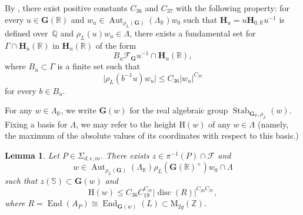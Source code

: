 \documentclass[11pt]{article}
\numberwithin{equation}{section}
\newcommand{\bQ}{\mathbb{Q}}
\newcommand{\bR}{\mathbb{R}}
\newcommand{\bZ}{\mathbb{Z}}
\newcommand{\cF}{\mathcal{F}}
\newcommand{\gG}{\mathbf{G}}
\newcommand{\gH}{\mathbf{H}}
\newcommand{\rH}{\mathrm{H}}
\newcommand{\rM}{\mathrm{M}}
\DeclareMathOperator{\Aut}{Aut}
\DeclareMathOperator{\disc}{disc}
\DeclareMathOperator{\End}{End}
\DeclareMathOperator{\Stab}{Stab}
\newcommand{\abs}[1]{\lvert #1 \rvert}
\newtheorem{lemma}{Lemma}[section]
\begin{document}
By \cite[Th.\,1.2]{QRTUI}, there exist positive constants $C_{36}$ and $C_{37}$ with the following property: for every $u\in\gG(\bR)$ and $w_u\in \Aut_{\rho_L(\gG)}(\Lambda_\bR) w_0$ such that $\gH_u = u \gH_{0,\bR} u^{-1}$ is defined over~$\bQ$ and $\rho_L(u) w_u \in \Lambda$, there exists a fundamental set for $\Gamma\cap\gH_u(\bR)$ in $\gH_u(\bR)$ of the form
\[
B_u\cF_\gG u^{-1}\cap\gH_u(\bR),\]
where $B_u\subset\Gamma$ is a finite set such that
\[\abs{\rho_L(b^{-1}u)w_u} \leq C_{36} \abs{w_u}^{C_{37}}\]
for every $b\in B_u$.

For any $w\in\Lambda_\bR$, we write $\gG(w)$ for the real algebraic group $\Stab_{\gG_\bR,\rho_L}(w)$. Fixing a basis for $\Lambda$, we may refer to the height $\rH(w)$ of any $w\in\Lambda$ (namely, the maximum of the absolute values of its coordinates with respect to this basis.)

\begin{lemma} \label{z-w}
Let $P\in\Sigma_{d,e,m}$. There exists $z\in \pi^{-1}(P)\cap\cF$ and
\[w\in \Aut_{\rho_L(\gG)}(\Lambda_\bR)\rho_L(\gG(\bR)^+)w_0\cap\Lambda\]
such that $z(\mathbb{S})\subset\gG(w)$ and
\[\rH(w)\leq C_{36}C_{19}^{C_{37}} \abs{\disc(R)}^{C_{20}C_{37}},\]
where $R=\End(A_P)\cong\End_{\gG(w)}(L)\subset \rM_{2g}(\bZ)$.
\end{lemma}
\end{document}
